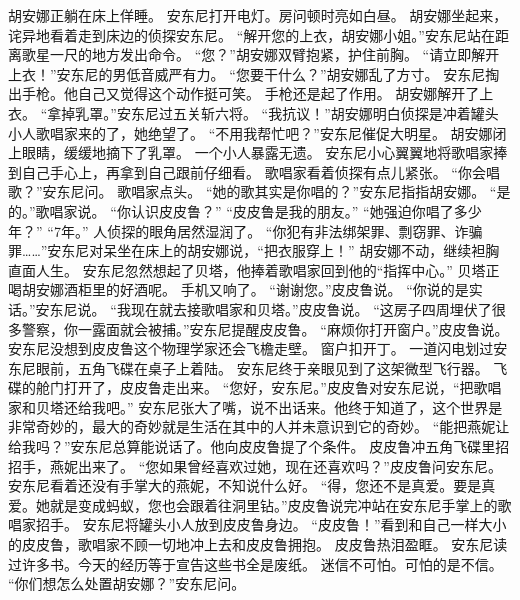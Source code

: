 \documentclass[a4paper,12pt,UTF8,twoside]{ctexbook}
\begin{document}
        胡安娜正躺在床上佯睡。 
        安东尼打开电灯。房问顿时亮如白昼。 
        胡安娜坐起来，诧异地看着走到床边的侦探安东尼。 
        “解开您的上衣，胡安娜小姐。”安东尼站在距离歌星一尺的地方发出命令。 
        “您？”胡安娜双臂抱紧，护住前胸。 
        “请立即解开上衣！”安东尼的男低音威严有力。 
        “您要干什么？”胡安娜乱了方寸。 
        安东尼掏出手枪。他自己又觉得这个动作挺可笑。 
        手枪还是起了作用。 
        胡安娜解开了上衣。 
        “拿掉乳罩。”安东尼过五关斩六将。 
        “我抗议！”胡安娜明白侦探是冲着罐头小人歌唱家来的了，她绝望了。 
        “不用我帮忙吧？”安东尼催促大明星。 
        胡安娜闭上眼睛，缓缓地摘下了乳罩。 
        一个小人暴露无遗。 
        安东尼小心翼翼地将歌唱家捧到自己手心上，再拿到自己跟前仔细看。 
        歌唱家看着侦探有点儿紧张。 
        “你会唱歌？”安东尼问。 
        歌唱家点头。 
        “她的歌其实是你唱的？”安东尼指指胡安娜。 
        “是的。”歌唱家说。 
        “你认识皮皮鲁？” 
        “皮皮鲁是我的朋友。” 
        “她强迫你唱了多少年？” 
        “7年。” 
        人侦探的眼角居然湿润了。 
        “你犯有非法绑架罪、剽窃罪、诈骗罪……”安东尼对呆坐在床上的胡安娜说，“把衣服穿上！” 
        胡安娜不动，继续袒胸直面人生。 
        安东尼忽然想起了贝塔，他捧着歌唱家回到他的“指挥中心。” 
        贝塔正喝胡安娜酒柜里的好酒呢。 
        手机又响了。 
        “谢谢您。”皮皮鲁说。 
        “你说的是实话。”安东尼说。 
        “我现在就去接歌唱家和贝塔。”皮皮鲁说。 
        “这房子四周埋伏了很多警察，你一露面就会被捕。”安东尼提醒皮皮鲁。 
        “麻烦你打开窗户。”皮皮鲁说。 
        安东尼没想到皮皮鲁这个物理学家还会飞檐走壁。 
        窗户扣开丁。 
        一道闪电划过安东尼眼前，五角飞碟在桌子上着陆。 
        安东尼终于亲眼见到了这架微型飞行器。 
        飞碟的舱门打开了，皮皮鲁走出来。 
        “您好，安东尼。”皮皮鲁对安东尼说，“把歌唱家和贝塔还给我吧。” 
        安东尼张大了嘴，说不出话来。他终于知道了，这个世界是非常奇妙的，最大的奇妙就是生活在其中的人并未意识到它的奇妙。 
        “能把燕妮让给我吗？”安东尼总算能说话了。他向皮皮鲁提了个条件。 
        皮皮鲁冲五角飞碟里招招手，燕妮出来了。 
        “您如果曾经喜欢过她，现在还喜欢吗？”皮皮鲁问安东尼。 
        安东尼看着还没有手掌大的燕妮，不知说什么好。 
        “得，您还不是真爱。要是真爱。她就是变成蚂蚁，您也会跟着往洞里钻。”皮皮鲁说完冲站在安东尼手掌上的歌唱家招手。 
        安东尼将罐头小人放到皮皮鲁身边。 
        “皮皮鲁！”看到和自己一样大小的皮皮鲁，歌唱家不顾一切地冲上去和皮皮鲁拥抱。 
        皮皮鲁热泪盈眶。 
        安东尼读过许多书。今天的经历等于宣告这些书全是废纸。 
        迷信不可怕。可怕的是不信。 
        “你们想怎么处置胡安娜？”安东尼问。 
\end{document}
